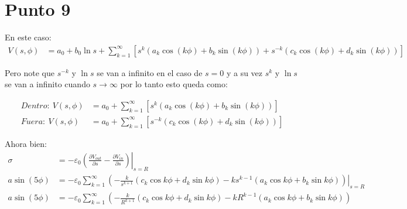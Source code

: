 \documentclass{report}
\begin{document}
\chapter{Punto 9}

En este caso:
\begin{align*}
	V \left( s, \phi \right) &= a_0 + b_0 \ln s + \sum_{k = 1}^{\infty} \left[ s^k \left( a_k \cos \left( k\phi \right) + b_k \sin \left( k\phi \right)\right) + s^{-k} \left( c_k \cos \left( k\phi \right) + d_k \sin \left( k\phi \right)\right)\right]
\end{align*}

Pero note que $s^{-k}$ y $\ln s$ se van a infinito en el caso de $s = 0$ y a su vez $s^k$ y $\ln s$ se van a infinito cuando $s \to \infty$ por lo tanto esto queda como:

\begin{align*}
	Dentro:\ V \left( s, \phi \right) &= a_0 + \sum_{k = 1}^{\infty} \left[ s^k \left( a_k \cos \left( k\phi \right) + b_k \sin \left( k\phi \right)\right) \right]\\
	Fuera:\ V \left( s, \phi \right) &= a_0 + \sum_{k = 1}^{\infty} \left[ s^{-k} \left( c_k \cos \left( k\phi \right) + d_k \sin \left( k\phi \right)\right)\right]
\end{align*}

Ahora bien:
\begin{align*}
	\sigma &= - \left.\varepsilon_0 \left( \frac{\partial V_{out}}{\partial s} - \frac{\partial V_{in}}{\partial s} \right)\right|_{s = R}\\
	a\sin \left( 5\phi \right)&= - \left.\varepsilon_0 \sum_{k = 1}^{\infty} \left( - \frac{k}{s^{k+1}}\left( c_k \cos k\phi + d_k \sin k\phi \right) - k s^{k - 1}\left( a_k \cos k\phi + b_k \sin k \phi \right) \right)\right|_{s = R}\\
	a\sin \left( 5\phi \right)&= - \varepsilon_0 \sum_{k = 1}^{\infty} \left( - \frac{k}{R^{k+1}}\left( c_k \cos k\phi + d_k \sin k\phi \right) - k R^{k - 1}\left( a_k \cos k\phi + b_k \sin k \phi \right) \right)\\
\end{align*}
\end{document}
